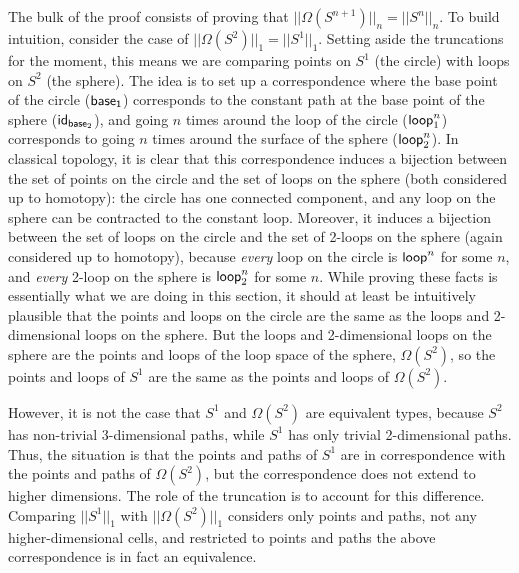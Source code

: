 The bulk of the proof consists of proving that $||\Omega(S^{n+1})||_n =
||S^{n}||_n$.  To build intuition, consider the case of
$||\Omega(S^2)||_1 = ||S^1||_1$.  Setting aside the truncations for the
moment, this means we are comparing points on $S^1$ (the circle) with
loops on $S^2$ (the sphere).  The idea is to set up a correspondence
where the base point of the circle ($\mathsf{base_1}$) corresponds to the
constant path at the base point of the sphere ($\mathsf{id}_{\mathsf{base}_2}$), and
going $n$ times around the loop of the circle ($\mathsf{loop}_1^n$)
corresponds to going $n$ times around the surface of the sphere
($\mathsf{loop}_2^n$).  In classical topology, it is clear that this
correspondence induces a bijection between the set of points on the
circle and the set of loops on the sphere (both considered up to
homotopy): the circle has one connected component, and any loop on the
sphere can be contracted to the constant loop.  Moreover, it induces a
bijection between the set of loops on the circle and the set of 2-loops
on the sphere (again considered up to homotopy), because \emph{every}
loop on the circle is $\mathsf{loop}^n$ for some $n$, and \emph{every}
2-loop on the sphere is $\mathsf{loop}_2^n$ for some $n$. While proving
these facts is essentially what we are doing in this section, it should
at least be intuitively plausible that the points and loops on the
circle are the same as the loops and 2-dimensional loops on the sphere.
But the loops and 2-dimensional loops on the sphere are the points and
loops of the loop space of the sphere, $\Omega(S^2)$, so the points and
loops of $S^1$ are the same as the points and loops of $\Omega(S^2)$.

However, it is not the case that $S^1$ and $\Omega(S^2)$ are equivalent
types, because $S^2$ has non-trivial 3-dimensional paths, while $S^1$
has only trivial 2-dimensional paths.  Thus, the situation is that the
points and paths of $S^1$ are in correspondence with the points and
paths of $\Omega(S^2)$, but the correspondence does not extend to higher
dimensions.  The role of the truncation is to account for this
difference.  Comparing $||S^1||_1$ with $||\Omega(S^2)||_1$ considers
only points and paths, not any higher-dimensional cells, and restricted
to points and paths the above correspondence is in fact an equivalence.

